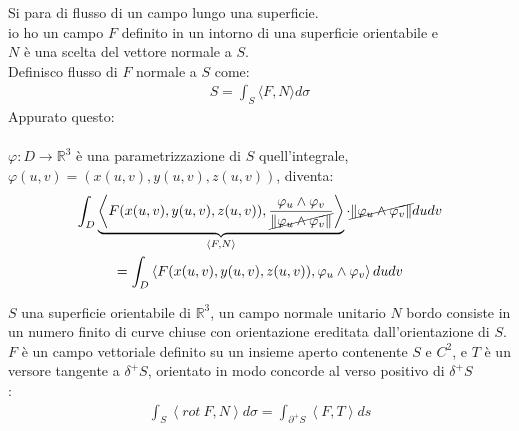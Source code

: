\documentclass[a4paper, oneside]{article}
\begin{document}
\begin{definition}
  Si para di flusso di un campo lungo una superficie.\\
   io ho un campo $F$ definito in un intorno di una superficie orientabile e\\
   $N$ è una scelta del vettore normale a $S$.\\
  Definisco flusso di $F$ normale a $S$ come:
  \begin{gather*}
    S = \int_S \langle F, N \rangle d \sigma
  \end{gather*}
  Appurato questo:\\
  \hfill\\
   $\varphi : D \to \mathbb{R}^3$ è una parametrizzazione di $S$ quell'integrale, \\
   $\varphi(u,v) = (x(u,v), y(u,v), z(u,v))$, diventa:
  \begin{gather*}
    \int_D \underbrace{\left\langle F(x(u,v), y(u,v), z(u,v)) , \frac{\varphi_u \land \varphi_v}{\cancel{\left\lVert \varphi_u \land \varphi_v \right\rVert}}\right\rangle }_{\left\langle F,N \right\rangle } \cdot \cancel{\left\lVert \varphi_u \land \varphi_v \right\rVert} dudv\\
    = \int_D \left\langle F(x(u,v), y(u,v), z(u,v)) , \varphi_u \land \varphi_v \right\rangle dudv
  \end{gather*}
\end{definition}


\begin{theorem}[di Stokes]
   $S$ una superficie orientabile di $\mathbb{R}^3$,  un campo normale unitario $N$  bordo consiste in un numero finito di curve chiuse con orientazione ereditata dall'orientazione di $S$.\\
   $F$ è un campo vettoriale definito su un insieme aperto contenente $S$ e $C^2$, e $T$ è 
  un versore tangente a $\delta^+ S$, orientato in modo concorde al verso positivo di $\delta^+ S$\\
  :
  \begin{gather*}
    \int_S \left\langle rot \ F, N \right\rangle d\sigma = \int_{\partial^+ S} \left\langle F, T \right\rangle ds  
  \end{gather*}
\end{theorem}
\end{document}
